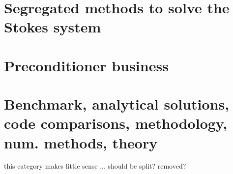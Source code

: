 \begin{scriptsize}
\end{scriptsize}

\section{Segregated methods to solve the Stokes system}

\begin{scriptsize}
\end{scriptsize}

\section{Preconditioner business}

\begin{scriptsize}
\end{scriptsize}

\section{Benchmark, analytical solutions, code comparisons, methodology, num. methods, theory}
{\color{red} this category makes little sense ... should be split? removed? }

